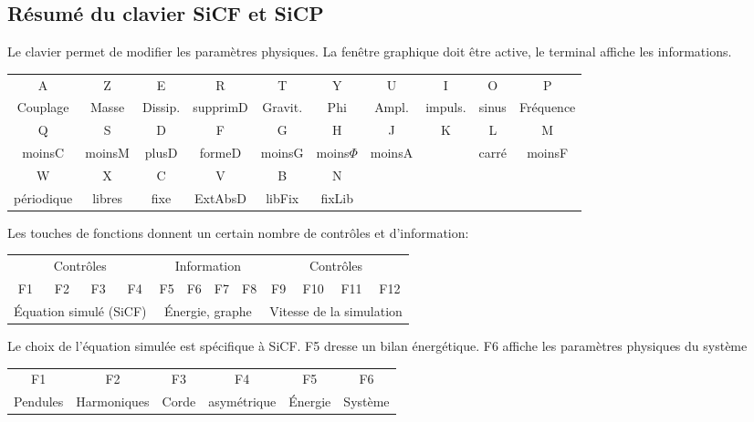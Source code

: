 \subsection{Résumé du clavier SiCF et SiCP}
%
Le clavier permet de modifier les paramètres physiques. La fenêtre graphique doit être active, le terminal affiche les informations.
\begin{center}
\begin{tabular}{cccccccccc}
\sf A &\sf Z &\sf E &\sf R &\sf T &\sf Y &\sf U &\sf I &\sf O &\sf P \\
Couplage & Masse & Dissip. & supprimD & Gravit. & Phi & Ampl. & impuls. & sinus & Fréquence \\
\sf Q &\sf S &\sf D &\sf F &\sf G &\sf H &\sf J &\sf K &\sf L &\sf M \\
moinsC & moinsM & plusD & formeD & moinsG & moins$\Phi$ & moinsA &  & carré & moinsF \\
\sf W &\sf X &\sf C &\sf V &\sf B &\sf N &  &  &  & \\
périodique & libres & fixe & ExtAbsD & libFix & fixLib &  &  &  & \\
\end{tabular}
\end{center}
\vspace{.3cm}
%
Les touches de fonctions donnent un certain nombre de contrôles et d'information:
%
\begin{center}
\begin{tabular}{ccccc ccccc cc}
\multicolumn{4}{|c|}{Contrôles} & \multicolumn{4}{c}{Information} & \multicolumn{4}{|c|}{Contrôles}\\
\sf F1 &\sf F2 &\sf F3 &\sf F4 &\sf F5 &\sf F6 &\sf F7 &\sf F8 &\sf F9 &\sf F10 &\sf F11 &\sf F12 \\
\multicolumn{4}{|c|}{Équation simulé (SiCF)} & \multicolumn{4}{c}{Énergie, graphe} & \multicolumn{4}{|c|}{Vitesse de la simulation}\\
\end{tabular}
\end{center}
%
Le choix de l'équation simulée est spécifique à SiCF. {\sf F5} dresse un bilan énergétique. {\sf F6} affiche les paramètres physiques du système
\begin{center}
\begin{tabular}{cccccc}
\sf F1 &\sf F2 &\sf F3 &\sf F4 &\sf F5 &\sf F6\\
Pendules & Harmoniques & Corde & asymétrique & Énergie & Système \\
\end{tabular}
\end{center}
